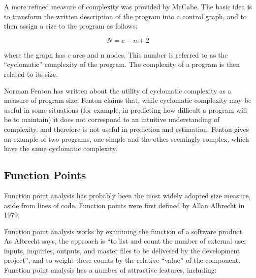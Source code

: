 A more refined measure of complexity was provided by McCabe.  The
basic idea is to transform the written description of the program into 
a control graph, and to then assign a size to the program as follows:

\[ N = e - n + 2 \]

where the graph has e arcs and n nodes.  This number is referred to as 
the ``cyclomatic'' complexity of the program.  The complexity of a program
is then related to its size.  

Norman Fenton has written about the utility of cyclomatic complexity as a
measure of program size\cite{Fenton}.  Fenton claims that, while cyclomatic
complexity may be useful in some situations (for example, in predicting how
difficult a program will be to maintain) it does not correspond to an
intuitive understanding of complexity, and therefore is not useful in
prediction and estimation.  Fenton gives an example of two programs, one
simple and the other seemingly complex, which have the same cyclomatic
complexity.

\subsection{Function Points}

Function point analysis has probably been the most widely adopted size 
measure, aside from lines of code.  Function points were
first defined by Allan Albrecht in 1979.  

Function point analysis works by examining the function of a software
product.  As Albrecht says, the approach is ``to list and count the
number of external user inputs, inquiries, outputs, and master files
to be delivered by the development project'', and to weight these
counts by the relative ``value'' of the component.  Function point
analysis has a number of attractive features, including:

